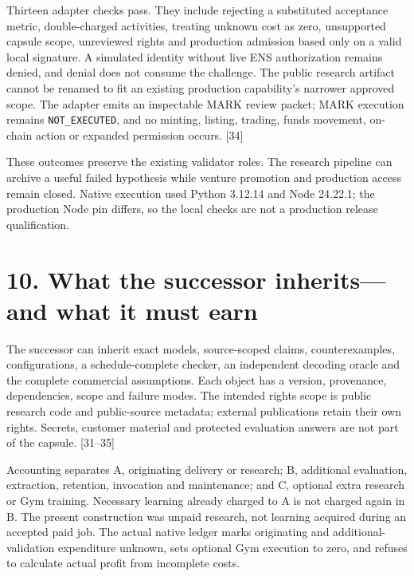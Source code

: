 \documentclass[
  11pt,
]{article}
\begin{document}
Thirteen adapter checks pass. They include rejecting a substituted
acceptance metric, double-charged activities, treating unknown cost as
zero, unsupported capsule scope, unreviewed rights and production
admission based only on a valid local signature. A simulated identity
without live ENS authorization remains denied, and denial does not
consume the challenge. The public research artifact cannot be renamed to
fit an existing production capability's narrower approved scope. The
adapter emits an inspectable MARK review packet; MARK execution remains
\texttt{NOT\_EXECUTED}, and no minting, listing, trading, funds
movement, on-chain action or expanded permission occurs. {[}34{]}

These outcomes preserve the existing validator roles. The research
pipeline can archive a useful failed hypothesis while venture promotion
and production access remain closed. Native execution used Python
3.12.14 and Node 24.22.1; the production Node pin differs, so the local
checks are not a production release qualification.

\hypertarget{what-the-successor-inheritsand-what-it-must-earn}{%
\section{10. What the successor inherits---and what it must
earn}\label{what-the-successor-inheritsand-what-it-must-earn}}

The successor can inherit exact models, source-scoped claims,
counterexamples, configurations, a schedule-complete checker, an
independent decoding oracle and the complete commercial assumptions.
Each object has a version, provenance, dependencies, scope and failure
modes. The intended rights scope is public research code and
public-source metadata; external publications retain their own rights.
Secrets, customer material and protected evaluation answers are not part
of the capsule. {[}31--35{]}

Accounting separates A, originating delivery or research; B, additional
evaluation, extraction, retention, invocation and maintenance; and C,
optional extra research or Gym training. Necessary learning already
charged to A is not charged again in B. The present construction was
unpaid research, not learning acquired during an accepted paid job. The
actual native ledger marks originating and additional-validation
expenditure unknown, sets optional Gym execution to zero, and refuses to
calculate actual profit from incomplete costs.
\end{document}
